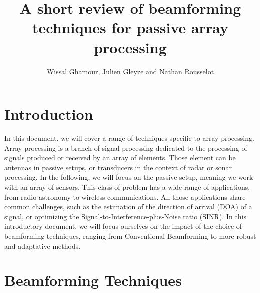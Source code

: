 \documentclass[12pt]{article}
\title{A short review of beamforming techniques for passive array processing} %
\author{Wissal Ghamour, Julien Gleyze and Nathan Rousselot}
\begin{document}
\maketitle
\section{Introduction}
In this document, we will cover a range of techniques specific to array processing. Array processing is a branch of signal processing dedicated to the processing of signals produced or received by an array of elements. Those element can be antennas in passive setups, or transducers in the context of radar or sonar processing. In the following, we will focus on the passive setup, meaning we work with an array of sensors. This class of problem has a wide range of applications, from radio astronomy to wireless communications. All those applications share common challenges, such as the estimation of the direction of arrival (DOA) of a signal, or optimizing the Signal-to-Interference-plus-Noise ratio (SINR). In this introductory document, we will focus ourselves on the impact of the choice of beamforming techniques, ranging from Conventional Beamforming to more robust and adaptative methods.

\section{Beamforming Techniques}

\end{document}
